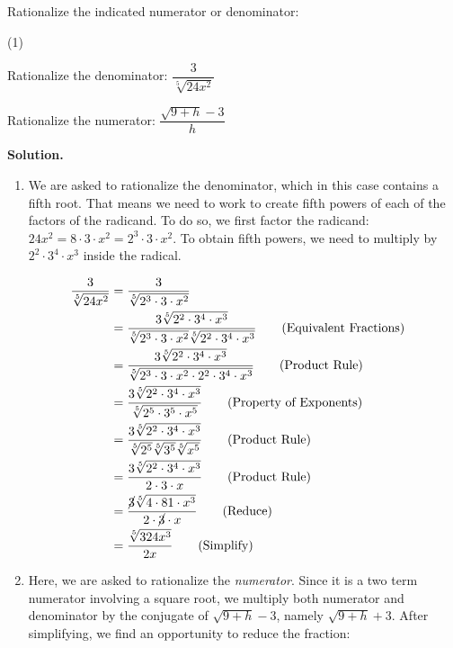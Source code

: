 \begin{ex} \label{rationalizenumdenom} Rationalize the indicated numerator or denominator:

\begin{tasks}(1)

\task  Rationalize the denominator:  $\dfrac{3}{\sqrt[5]{24x^2}}$

\task  Rationalize the numerator: $\dfrac{\sqrt{9 + h} - 3}{h}$

\end{tasks}

{\bf Solution.}

\begin{enumerate}

\item We are asked to rationalize the denominator, which in this case contains a fifth root.  That means we need to work to create fifth powers of each of the factors of the radicand.  To do so, we first factor the radicand:  $24x^2 = 8 \cdot 3 \cdot x^2 = 2^3 \cdot 3 \cdot x^2$.  To obtain fifth powers, we need to multiply by $2^2 \cdot 3^4 \cdot x^3$ inside the radical.

\begin{align*}
\dfrac{3}{\sqrt[5]{24x^2}} & = \dfrac{3}{\sqrt[5]{2^3 \cdot 3 \cdot x^2}} & \\ 
& = \dfrac{3 \sqrt[5]{2^2 \cdot 3^4 \cdot x^3}}{\sqrt[5]{2^3 \cdot 3 \cdot x^2}\sqrt[5]{2^2 \cdot 3^4 \cdot x^3}} \tag{Equivalent Fractions} \\
& = \dfrac{3 \sqrt[5]{2^2 \cdot 3^4 \cdot x^3}}{\sqrt[5]{2^3 \cdot 3 \cdot x^2 \cdot 2^2 \cdot 3^4 \cdot x^3}} \tag{Product Rule} \\
& = \dfrac{3 \sqrt[5]{2^2 \cdot 3^4 \cdot x^3}}{\sqrt[5]{2^5 \cdot 3^5 \cdot x^5}} \tag{Property of Exponents}\\
& = \dfrac{3 \sqrt[5]{2^2 \cdot 3^4 \cdot x^3}}{\sqrt[5]{2^5} \sqrt[5]{3^5}\sqrt[5]{x^5}} \tag{Product Rule}\\
& = \dfrac{3 \sqrt[5]{2^2 \cdot 3^4\cdot x^3}}{2 \cdot 3 \cdot x} \tag{Product Rule}\\
& = \dfrac{\cancel{3} \sqrt[5]{4 \cdot 81\cdot x^3}}{2 \cdot \cancel{3} \cdot x} \tag{Reduce}\\
& = \dfrac{\sqrt[5]{324x^3}}{2x} \tag{Simplify}\\
\end{align*}
													
\item  Here, we are asked to rationalize the \textit{numerator}.  Since it is a two term numerator involving a square root, we multiply both numerator and denominator by the conjugate of $\sqrt{9 + h} - 3$, namely $\sqrt{9 + h} + 3$.  After simplifying, we find an opportunity to reduce the fraction:


\end{enumerate}
\end{ex}
